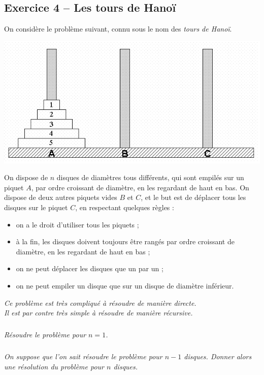 \subsection*{Exercice 4 -- Les tours de Hanoï}

\setcounter{exo}{0}

\ifprof
\else
On considère le problème suivant, connu sous le nom des \emph{tours de Hanoï}.

\begin{center}
\includegraphics[scale=0.3]{images/hanoi.png}
\end{center}

On dispose de $n$ disques de diamètres tous différents, qui sont empilés sur un piquet $A$, par ordre croissant 
de 
diamètre, en les regardant de haut en bas. On dispose de deux autres piquets vides $B$ et $C$, et le but est de 
déplacer tous les disques sur le piquet $C$, en respectant quelques règles :
\begin{itemize}
\item on a le droit d'utiliser tous les piquets ;
\item à la fin, les disques doivent toujours être rangés par ordre croissant de diamètre, en les regardant de 
haut 
en bas ;
\item on ne peut déplacer les disques que un par un ;
\item on ne peut empiler un disque que sur un disque de diamètre inférieur.
\end{itemize}

\textit{Ce problème est très compliqué à résoudre de manière directe.\\
Il est par contre très simple à résoudre de manière récursive.}
\fi
\subparagraph{} 
\textit{Résoudre le problème pour $n=1$.}


\subparagraph{} 
\textit{On suppose que l'on sait résoudre le problème pour $n-1$ disques. Donner alors une résolution du 
problème pour $n$ disques.}


